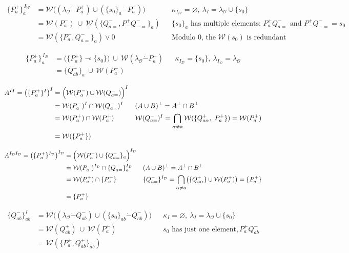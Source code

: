 \documentclass{article}
\theoremstyle{definition}
\newcommand{\cD}{\mathcal{D}}
\newcommand{\cO}{\mathcal{O}}
\newcommand{\cW}{\mathcal{W}}
\newcommand{\monus}{\mathbin{\dot-}}
\begin{document}
\begin{align*}
\{P^+_a\}_{a}^{\,I_\cW}
&=\cW\bigl((\lambda_\cO\monus P^+_a)\cup(\{s_0\}_a\monus P^+_a)\bigr)
  && \kappa_{I_\cW}=\varnothing,\ \lambda_I=\lambda_\cO\cup\{s_0\}\\
&=\cW(P^-_a)\ \cup\ \cW(\{Q^-_{a=},P^+_-Q^-_{-=}\}_a)
  && \{s_0\}_a \text{ has multiple elements: } P^+_aQ^-_{a=} \text{ and } P^+_-Q^-_{-=}=s_0\\
&=\cW(\{P^-_a,Q^-_{a=}\}_a) \vee 0
  && \text{Modulo 0, the } \cW(s_0)\text{ is redundant}
\end{align*}

\begin{align*}
\{P^+_a\}_{a}^{\,I_\cD }
&=\bigl(\{P^+_a\}\multimap\{s_0\}\bigr)\ \cup\ \cW(\lambda_\cO\monus P^+_a)
  && \kappa_{I_\cD }=\{s_0\},\ \lambda_{I_\cD }=\lambda_\cO\\
&=\{Q^-_{ab}\}_{a}\ \cup\ \cW(P^-_a)
  && 
\end{align*}

\begin{align*}
A^{II}=\bigl(\{P^+_a\}^{I}\bigr)^{I}
&=\Bigl(\cW(P^-_a)\cup\textstyle\cW(Q^-_{a=})\Bigr)^{I} && \\
&=\cW(P^-_a)^I \cap \cW(Q^-_{a=})^I
  && (A\cup B)^\bot=A^\bot\cap B^\bot\\
&=\cW(P^+_a)\cap \cW(P^+_a)
  && \cW(Q^-_{a=})^I = \bigcap_{\alpha \ne a} \cW(\{Q^+_{a\alpha},\ P^+_a\})=\cW(P^+_a)\\
&=\cW(\{P^+_a\})\\
\end{align*}

\begin{align*}
A^{I_\cD I_\cD }=\bigl(\{P^+_a\}^{I_\cD }\bigr)^{I_\cD }
&=\Bigl(\cW(P^-_{a}) \cup \{Q^-_{a=}\}_a \Bigr)^{I_\cD } && \\
  &=\cW(P^-_a)^{I_\cD } \cap \{Q^-_{a=}\}_a^{I_\cD } && (A\cup B)^\bot=A^\bot\cap B^\bot\\
  &=\cW(P^+_a)\cap \{P^+_a\} && \{Q^-_{a=}\}^{I_\cD } = \bigcap_{\alpha \ne a} \bigl(\{Q^+_{a\alpha}\} \cup \cW(P^+_a)\bigr) = \{P^+_a\}\\
  &=\{P^+_a\} && \\
\end{align*}

\begin{align*}
\{Q^-_{ab}\}_{ab}^{I}
&=\cW\bigl((\lambda_\cO\monus Q^-_{ab})\cup(\{s_0\}_{ab}\monus Q^-_{ab})\bigr)
  && \kappa_I=\varnothing,\ \lambda_I=\lambda_\cO\cup\{s_0\}\\
&=\cW(Q^+_{ab})\ \cup\ \cW(P^+_a) && s_0 \text{ has just one element}, P^+_aQ^-_{ab}\\
&=\cW(\{P^+_a,Q^+_{ab}\}_{ab}) && \\
\end{align*}
\end{document}
